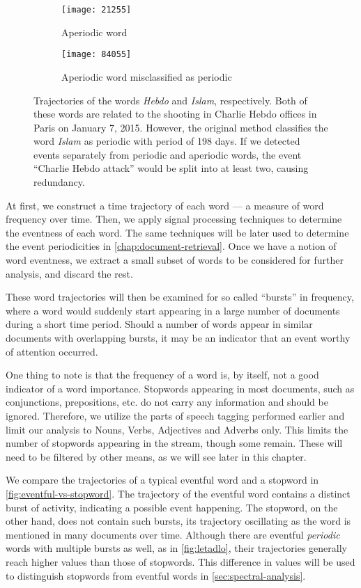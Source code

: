 \begin{figure}
\centering
\begin{subfigure}{.5\textwidth}
  \centering
  \texttt{[image: 21255]}  %
  \caption{Aperiodic word}
  \label{fig:hebdo}
\end{subfigure}%
\begin{subfigure}{.5\textwidth}
  \centering
  \texttt{[image: 84055]}  %
  \caption{Aperiodic word misclassified as periodic}
  \label{fig:islam}
\end{subfigure}
\caption{Trajectories of the words \textit{Hebdo} and \textit{Islam}, respectively. Both of these words are related to the shooting in Charlie Hebdo offices in Paris on January 7, 2015. However, the original method classifies the word \textit{Islam} as periodic with period of 198 days. If we detected events separately from periodic and aperiodic words, the event ``Charlie Hebdo attack'' would be split into at least two, causing redundancy.}
\label{fig:misclassified}
\end{figure}


At first, we construct a time trajectory of each word --- a measure of word frequency over time. Then, we apply signal processing techniques to determine the eventness of each word. The same techniques will be later used to determine the event periodicities in \autoref{chap:document-retrieval}. Once we have a notion of word eventness, we extract a small subset of words to be considered for further analysis, and discard the rest.

These word trajectories will then be examined for so called ``bursts'' in frequency, where a word would suddenly start appearing in a large number of documents during a short time period. Should a number of words appear in similar documents with overlapping bursts, it may be an indicator that an event worthy of attention occurred.

One thing to note is that the frequency of a word is, by itself, not a good indicator of a word importance.
Stopwords appearing in most documents, such as conjunctions, prepositions, etc. do not carry any information and should be ignored. Therefore, we utilize the parts of speech tagging performed earlier and limit our analysis to Nouns, Verbs, Adjectives and Adverbs only. This limits the number of stopwords appearing in the stream, though some remain. These will need to be filtered by other means, as we will see later in this chapter.

We compare the trajectories of a typical eventful word and a stopword in \autoref{fig:eventful-vs-stopword}. The trajectory of the eventful word contains a distinct burst of activity, indicating a possible event happening. The stopword, on the other hand, does not contain such bursts, its trajectory oscillating as the word is mentioned in many documents over time. Although there are eventful \textit{periodic} words with multiple bursts as well, as in \autoref{fig:letadlo}, their trajectories generally reach higher values than those of stopwords. This difference in values will be used to distinguish stopwords from eventful words in \autoref{sec:spectral-analysis}.

